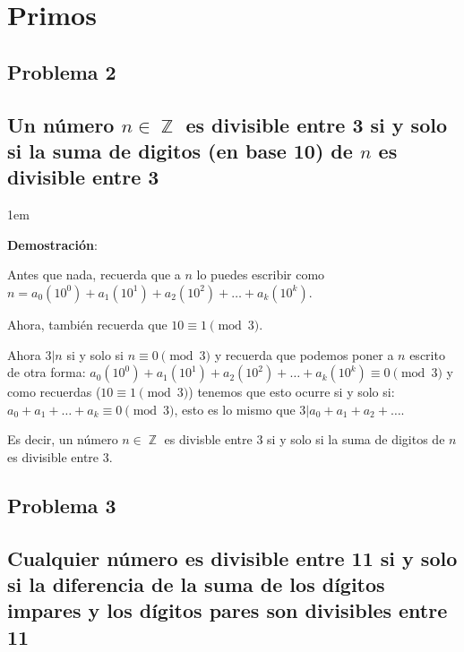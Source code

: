 \documentclass[12pt, fleqn]{article}                             %
\newenvironment{SmallIndentation}[1][0.75em]                    %
    {\begin{adjustwidth}{#1}{}\begin{footnotesize}}                 %
    {\end{footnotesize}\end{adjustwidth}}                           %
\DeclareMathOperator \Integers  {\mathbb{Z}}                     %
\begin{document}
\clearpage
\section{Primos}

    \subsection{Problema 2}
    \subsection*{Un número $n \in \Integers$ es divisible entre 3 si y solo si
        la suma de digitos (en base 10) de $n$ es divisible entre 3}

        \begin{SmallIndentation}[1em]
            \textbf{Demostración}:

            Antes que nada, recuerda que a $n$ lo puedes escribir como
            $n = a_0(10^0) + a_1(10^1) + a_2(10^2) + \dots + a_k(10^k)$.

            Ahora, también recuerda que $10 \equiv 1 \pmod{3}$.

            Ahora $3|n$ si y solo si $n \equiv 0 \pmod{3}$ y recuerda
            que podemos poner a $n$ escrito de otra forma:
            $a_0(10^0) + a_1(10^1) + a_2(10^2) + \dots + a_k(10^k) \equiv 0 \pmod{3}$
            y como recuerdas ($10 \equiv 1 \pmod{3}$) tenemos que esto ocurre
            si y solo si:  $a_0 + a_1 +\dots +a_k \equiv 0 \pmod{3}$, esto es lo mismo que
            $3|a_0+a_1+a_2+\dots$.

            Es decir, un número $n \in \Integers$ es divisble entre 3 si y solo si
            la suma de digitos de $n$ es divisible entre 3.

        \end{SmallIndentation}



    \subsection{Problema 3}
    \subsection*{Cualquier número es divisible entre 11 si y solo si la diferencia de la suma
        de los dígitos impares y los dígitos pares son divisibles entre 11}
\end{document}
